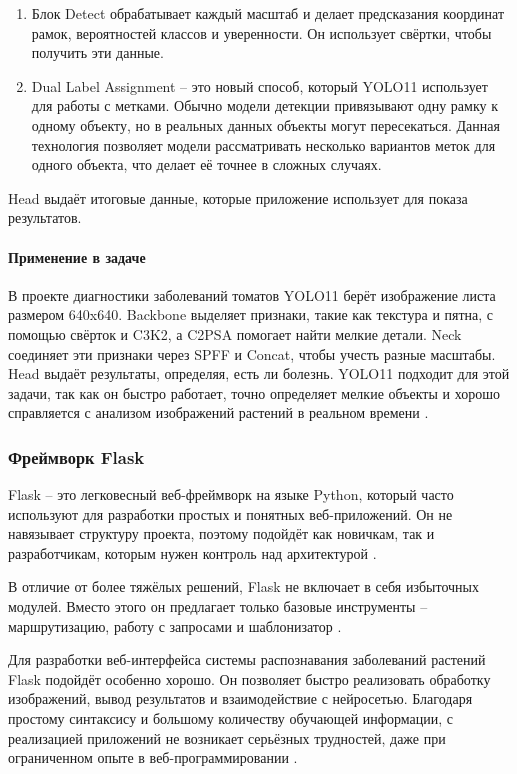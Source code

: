 \begin{enumerate}
	\item Блок Detect обрабатывает каждый масштаб и делает предсказания координат рамок, вероятностей классов и уверенности. Он использует свёртки, чтобы получить эти данные.
	
	\item Dual Label Assignment -- это новый способ, который YOLO11 использует для работы с метками. Обычно модели детекции привязывают одну рамку к одному объекту, но в реальных данных объекты могут пересекаться. Данная технология позволяет модели рассматривать несколько вариантов меток для одного объекта, что делает её точнее в сложных случаях.
	
\end{enumerate}

Head выдаёт итоговые данные, которые приложение использует для показа результатов.

\paragraph{Применение в задаче}

В проекте диагностики заболеваний томатов YOLO11 берёт изображение листа размером 640x640. Backbone выделяет признаки, такие как текстура и пятна, с помощью свёрток и C3K2, а C2PSA помогает найти мелкие детали. Neck соединяет эти признаки через SPFF и Concat, чтобы учесть разные масштабы. Head выдаёт результаты, определяя, есть ли болезнь. YOLO11 подходит для этой задачи, так как он быстро работает, точно определяет мелкие объекты и хорошо справляется с анализом изображений растений в реальном времени \cite{yolo10}.

\subsubsection{Фреймворк Flask}

Flask -- это легковесный веб-фреймворк на языке Python, который часто используют для разработки простых и понятных веб-приложений. Он не навязывает структуру проекта, поэтому подойдёт как новичкам, так и разработчикам, которым нужен контроль над архитектурой \cite{flask1}.

В отличие от более тяжёлых решений, Flask не включает в себя избыточных модулей. Вместо этого он предлагает только базовые инструменты -- маршрутизацию, работу с запросами и шаблонизатор \cite{flask2}.

Для разработки веб-интерфейса системы распознавания заболеваний растений Flask подойдёт особенно хорошо. Он позволяет быстро реализовать обработку изображений, вывод результатов и взаимодействие с нейросетью. Благодаря простому синтаксису и большому количеству обучающей информации, с реализацией приложений не возникает серьёзных трудностей, даже при ограниченном опыте в веб-программировании \cite{flask4}.

